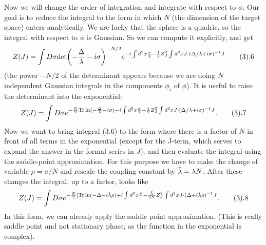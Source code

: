 Now we will change the order of integration and integrate with respect to 
$\phi$. Our goal is to reduce the integral to the form 
in which $N$ (the dimension of the target space) enters analytically. 
We are lucky that the sphere is a quadric, so the integral with 
respect to $\phi$ is Gaussian. So we can compute it explicitly, and get 
$$
Z(J)=\int D\sigma \text{det} \biggl(-\frac{\Delta}{\l}-i\sigma\biggr)^{-N/2}
e^{-i\int d^2x\frac{\sigma}{2} -\frac{1}{2}Z_J^2\int d^2x
J\cdot (\Delta/\l+i\sigma)^{-1}J }\tag 3.6
$$
(the power $-N/2$ of the determinant appears because we are doing $N$ 
independent Gaussian integrals in the components $\phi_i$ of $\phi$). 
It is useful to raise the determinant into the exponential:
$$
Z(J)=\int D\sigma e^{-\frac{N}{2}\text{Tr}\ln(-\frac{\Delta}{\l}-i\sigma)
-i\int d^2x\frac{\sigma}{2} -\frac{1}{2}Z_J^2\int d^2x
J\cdot (\Delta/\l+i\sigma)^{-1}J }.\tag 3.7
$$
Now we want to bring integral (3.6) to the form where there is a factor of $N$
in front of all terms in the exponential (except for the J-term, which 
serves to expand the answer in the formal series in $J$), and then evaluate 
the integral using the saddle-point approximation. 
For this purpose we have to make the change of variable
$\rho=\sigma/N$ and rescale the coupling constant by $\tilde\lambda
=\lambda N$. After these changes the integral, up to a factor, looks like
$$
Z(J)=\int D\sigma e^{-\frac{N}{2}[\text{Tr}\ln(-\Delta-i\tl\rho)
+i\int d^2x\frac{\rho}] -\frac{\tl}{2N}Z_J^2\int d^2x
J\cdot (\Delta+i\tl\rho)^{-1}J }.\tag 3.8
$$
In this form, we can already apply the saddle point approximation.
(This is really saddle point and not stationary phase, as the function in the 
exponential is complex). 

